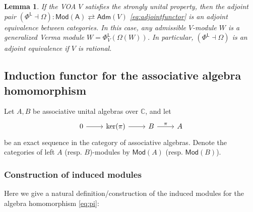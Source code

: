 \documentclass[12pt,a4paper,reqno]{amsart}
\numberwithin{equation}{section}
\numberwithin{equation}{section}
\newtheorem{lm}[thm]{Lemma}
\theoremstyle{definition}
\def \C {\mathbb{C}}
\def\L{\mathcal{L}}
\def\Om{\Omega}
\def\L{\mathsf{L}}
\def\Mod{\mathsf{Mod}}
\def\L{\mathsf{L}}
\def\A{\mathsf{A}}
\begin{document}
	
	\begin{lm}\cite{DGK2,GGKL25}\label{lm:adjointequi}
	If the VOA $V$ satisfies the strongly unital property, then the adjoint pair $(\Phi^\L \dashv \Om):\mathsf{Mod}(\A)\rightleftarrows\mathsf{Adm}(V)$ \eqref{eq:adjointfunctor} is an adjoint equivalence between categories. In this case, any admissible $V$-module $W$ is a generalized Verma module $W=\Phi^\L_V(\Om(W))$.  
		In particular, $(\Phi^\L\dashv \Om)$ is an adjoint equivalence if $V$ is rational. 
	\end{lm}



	
	
	\subsection{Induction functor for the associative algebra homomorphism}\label{sec:2.2}
	Let $A,B$ be associative unital algebras over $\C$, and let
	\begin{equation}\label{eq:pi}
		\begin{tikzcd}
			0\arrow[r]& \ker(\pi)\arrow[r]& B\arrow[r,"\pi"]& A
		\end{tikzcd}
	\end{equation}
	be an exact sequence in the category of associative algebras. Denote the categories of left $A$ (resp. $B$)-modules by $\Mod(A)$ (resp. $\Mod(B)$). 
	\subsubsection{Construction of induced modules}
	Here we give a natural definition/construction of the induced modules for the algebra homomorphism \eqref{eq:pi}: 
	
\end{document}

